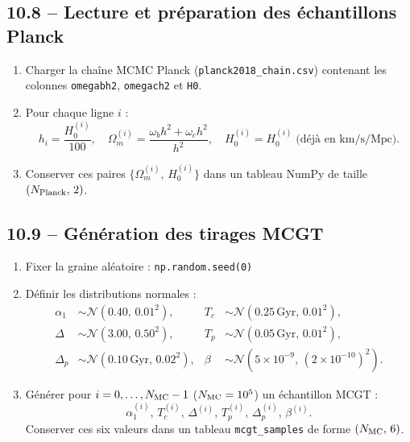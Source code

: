 \subsection{10.8 – Lecture et préparation des échantillons Planck}
\begin{enumerate}
  \item Charger la chaîne MCMC Planck (\texttt{planck2018\_chain.csv}) contenant les colonnes \texttt{omegabh2}, \texttt{omegach2} et \texttt{H0}.
  \item Pour chaque ligne \(i\) :
    \[
      h_{i} = \frac{H_{0}^{(i)}}{100}, 
      \quad
      \Omega_{m}^{(i)} = \frac{\omega_{b}h^{2} + \omega_{c}h^{2}}{h^{2}},
      \quad
      H_{0}^{(i)} = H_{0}^{(i)}\;\text{(déjà en km/s/Mpc)}.
    \]
  \item Conserver ces paires \(\{\Omega_{m}^{(i)},\,H_{0}^{(i)}\}\) dans un tableau NumPy de taille \((N_{\rm Planck},\,2)\).
\end{enumerate}

\subsection{10.9 – Génération des tirages MCGT}
\begin{enumerate}
  \item Fixer la graine aléatoire :  
    \verb|np.random.seed(0)|  

  \item Définir les distributions normales :
    \begin{align*}
      \alpha_{1} &\sim \mathcal{N}(0.40,\,0.01^{2}), &
      T_{c} &\sim \mathcal{N}(0.25\,\mathrm{Gyr},\,0.01^{2}), \\
      \Delta &\sim \mathcal{N}(3.00,\,0.50^{2}), &
      T_{p} &\sim \mathcal{N}(0.05\,\mathrm{Gyr},\,0.01^{2}), \\
      \Delta_{p} &\sim \mathcal{N}(0.10\,\mathrm{Gyr},\,0.02^{2}), &
      \beta &\sim \mathcal{N}(5\times10^{-9},\,(2\times10^{-10})^{2}).
    \end{align*}

  \item Générer pour \(i=0,\dots,N_{\rm MC}-1\) (\(N_{\rm MC}=10^{5}\)) un échantillon MCGT :
    \[
      \alpha_{1}^{(i)},\,T_{c}^{(i)},\,\Delta^{(i)},\,T_{p}^{(i)},\,\Delta_{p}^{(i)},\,\beta^{(i)}.
    \]
    Conserver ces six valeurs dans un tableau \texttt{mcgt\_samples} de forme \((N_{\rm MC},\,6)\).
\end{enumerate}

